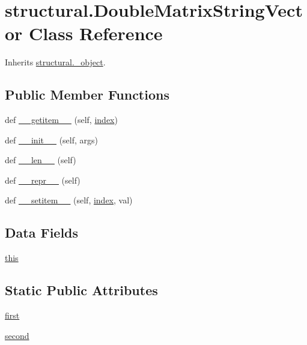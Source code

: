 \hypertarget{classstructural_1_1_double_matrix_string_vector}{}\section{structural.\+Double\+Matrix\+String\+Vector Class Reference}
\label{classstructural_1_1_double_matrix_string_vector}


Inherits \hyperlink{classstructural_1_1__object}{structural.\+\_\+object}.

\subsection*{Public Member Functions}
\begin{DoxyCompactItemize}
\item 
def \hyperlink{classstructural_1_1_double_matrix_string_vector_aacbcafa28bd7ddad9cd2a17057ea7449}{\+\_\+\+\_\+getitem\+\_\+\+\_\+} (self, \hyperlink{lp__lib_8h_a1499949ec4dbbc5290ece2ac210bba35}{index})
\item 
def \hyperlink{classstructural_1_1_double_matrix_string_vector_ab12113b74a16c5b03553ed2c1df53c84}{\+\_\+\+\_\+init\+\_\+\+\_\+} (self, args)
\item 
def \hyperlink{classstructural_1_1_double_matrix_string_vector_ad86066f0de55a0cbd6932d03026ff603}{\+\_\+\+\_\+len\+\_\+\+\_\+} (self)
\item 
def \hyperlink{classstructural_1_1_double_matrix_string_vector_acafded7fe587446cd11d8f6b9c853656}{\+\_\+\+\_\+repr\+\_\+\+\_\+} (self)
\item 
def \hyperlink{classstructural_1_1_double_matrix_string_vector_aa3f58e7f2cd7e92df971478a41a86580}{\+\_\+\+\_\+setitem\+\_\+\+\_\+} (self, \hyperlink{lp__lib_8h_a1499949ec4dbbc5290ece2ac210bba35}{index}, val)
\end{DoxyCompactItemize}
\subsection*{Data Fields}
\begin{DoxyCompactItemize}
\item 
\hyperlink{classstructural_1_1_double_matrix_string_vector_ab99956cc5c37a7759a5049cf4ebcb800}{this}
\end{DoxyCompactItemize}
\subsection*{Static Public Attributes}
\begin{DoxyCompactItemize}
\item 
\hyperlink{classstructural_1_1_double_matrix_string_vector_ac58853e1b650b04c798238bd4be96d70}{first}
\item 
\hyperlink{classstructural_1_1_double_matrix_string_vector_aa21ec41b9c3c8e60e47255de4e07ec55}{second}
\end{DoxyCompactItemize}


